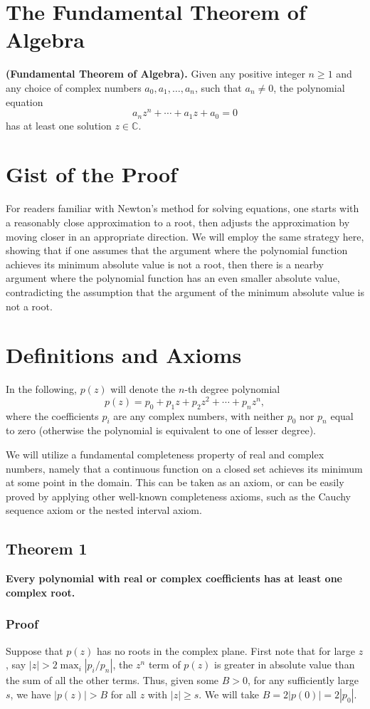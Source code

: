 \section{The Fundamental Theorem of Algebra}

\textbf{(Fundamental Theorem of Algebra).} Given any positive integer $n \geq 1$ and any choice of complex numbers $a_0, a_1, \ldots, a_n$, such that $a_n \neq 0$, the polynomial equation
\[
	a_n z^n + \cdots + a_1 z + a_0 = 0 \tag{1}
\]
has at least one solution $z \in \mathbb{C}$.

\section*{Gist of the Proof}
For readers familiar with Newton’s method for solving equations, one starts with a reasonably close approximation to a root, then adjusts the approximation by moving closer in an appropriate direction. We will employ the same strategy here, showing that if one assumes that the argument where the polynomial function achieves its minimum absolute value is not a root, then there is a nearby argument where the polynomial function has an even smaller absolute value, contradicting the assumption that the argument of the minimum absolute value is not a root.

\section*{Definitions and Axioms}
In the following, $p(z)$ will denote the $n$-th degree polynomial
\[
	p(z) = p_0 + p_1 z + p_2 z^2 + \cdots + p_n z^n,
\]
where the coefficients $p_i$ are any complex numbers, with neither $p_0$ nor $p_n$ equal to zero (otherwise the polynomial is equivalent to one of lesser degree).

We will utilize a fundamental completeness property of real and complex numbers, namely that a continuous function on a closed set achieves its minimum at some point in the domain. This can be taken as an axiom, or can be easily proved by applying other well-known completeness axioms, such as the Cauchy sequence axiom or the nested interval axiom.

\subsection{Theorem 1}
\textbf{Every polynomial with real or complex coefficients has at least one complex root.}

\subsubsection*{Proof}
Suppose that $p(z)$ has no roots in the complex plane. First note that for large $z$, say $|z| > 2 \max_i |p_i/p_n|$, the $z^n$ term of $p(z)$ is greater in absolute value than the sum of all the other terms. Thus, given some $B > 0$, for any sufficiently large $s$, we have $|p(z)| > B$ for all $z$ with $|z| \geq s$. We will take $B = 2|p(0)| = 2|p_0|$.


